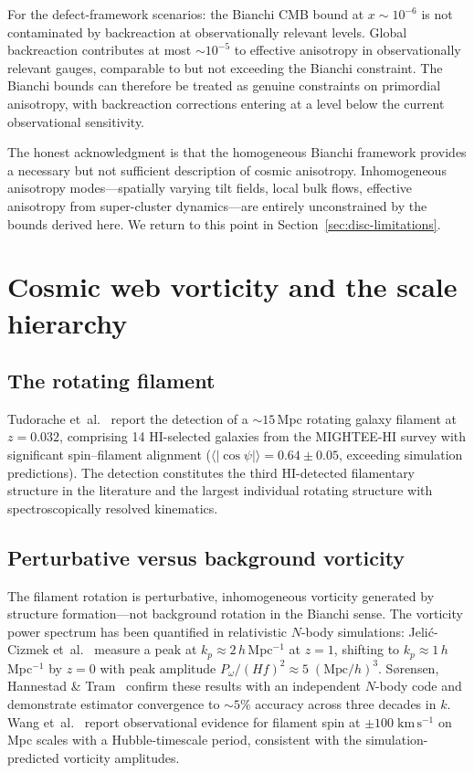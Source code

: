 For the defect-framework scenarios: the Bianchi CMB bound at
$x \sim 10^{-6}$ is not contaminated by backreaction at
observationally relevant levels.  Global backreaction contributes
at most $\sim 10^{-5}$ to effective anisotropy in
observationally relevant gauges, comparable to but not exceeding
the Bianchi constraint.  The Bianchi bounds can therefore be
treated as genuine constraints on primordial anisotropy, with
backreaction corrections entering at a level below the current
observational sensitivity.

The honest acknowledgment is that the homogeneous Bianchi
framework provides a necessary but not sufficient description
of cosmic anisotropy.  Inhomogeneous anisotropy
modes---spatially varying tilt fields, local bulk flows,
effective anisotropy from super-cluster dynamics---are entirely
unconstrained by the bounds derived here.  We return to this
point in Section~\ref{sec:disc-limitations}.


\section{Cosmic web vorticity and the scale hierarchy}
\label{sec:disc-cosmic-web}

\subsection{The rotating filament}

Tudorache et~al.~\cite{Tudorache2025} report the detection of
a $\sim 15\,$Mpc rotating galaxy filament at $z = 0.032$,
comprising 14 HI-selected galaxies from the MIGHTEE-HI survey
with significant spin--filament alignment
($\langle|\cos\psi|\rangle = 0.64 \pm 0.05$, exceeding
simulation predictions).  The detection constitutes the third
HI-detected filamentary structure in the literature and the
largest individual rotating structure with spectroscopically
resolved kinematics.


\subsection{Perturbative versus background vorticity}

The filament rotation is perturbative, inhomogeneous vorticity
generated by structure formation---not background rotation in
the Bianchi sense.  The vorticity power spectrum has been
quantified in relativistic $N$-body simulations:
Jeli\'c-Cizmek et~al.~\cite{JelicCizmek2018} measure a peak
at $k_p \approx 2\,h\,$Mpc$^{-1}$ at $z = 1$, shifting to
$k_p \approx 1\,h\,$Mpc$^{-1}$ by $z = 0$ with peak amplitude
$P_\omega/(Hf)^2 \approx 5\;(\mathrm{Mpc}/h)^3$.
S\o rensen, Hannestad \& Tram~\cite{Sorensen2025} confirm these
results with an independent $N$-body code and demonstrate
estimator convergence to $\sim\!5\%$ accuracy across three
decades in $k$.  Wang et~al.~\cite{Wang2021} report
observational evidence for filament spin at
$\pm 100\;\mathrm{km\,s^{-1}}$ on Mpc scales with a
Hubble-timescale period, consistent with the
simulation-predicted vorticity amplitudes.

